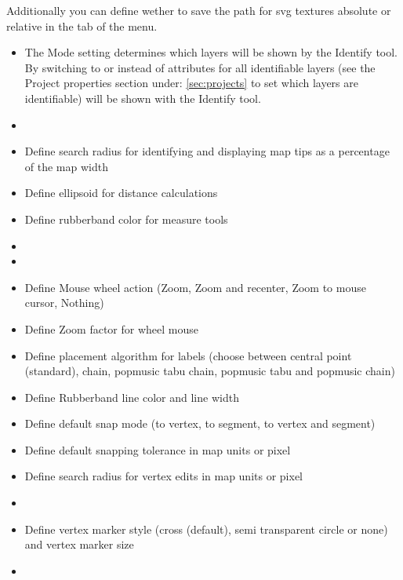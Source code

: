 Additionally you can define wether to save the path for svg textures
absolute or relative in the  tab of the
 \arrow {}
menu.


\begin{itemize}
\item The Mode setting determines which layers will be shown by the Identify
tool. By switching to  or  instead of  attributes for all identifiable
layers (see the Project properties section under: \ref{sec:projects} to set
which layers are identifiable) will be shown with the Identify tool.
\item {}
\item Define search radius for identifying and displaying map tips as a
percentage of the map width
\item Define ellipsoid for distance calculations
\item Define rubberband color for measure tools
\item {}
\item {}
\item Define Mouse wheel action (Zoom, Zoom and recenter, Zoom to mouse
cursor, Nothing)
\item Define Zoom factor for wheel mouse
\end{itemize}


\begin{itemize}
\item Define placement algorithm for labels (choose between central point
(standard), chain, popmusic tabu chain, popmusic tabu and popmusic chain)
\end{itemize}


\begin{itemize}
\item Define Rubberband line color and line width
\item Define default snap mode (to vertex, to segment, to vertex and segment)
\item Define default snapping tolerance in map units or pixel
\item Define search radius for vertex edits in map units or pixel
\item {}
\item Define vertex marker style (cross (default), semi transparent circle or
none) and vertex marker size
\item {}
\end{itemize}


